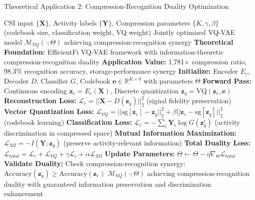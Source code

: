 \documentclass[journal]{IEEEtran}
\begin{document}
\begin{algorithm}[h]
\caption{Theoretical Application 2: Compression-Recognition Duality Optimization}
\label{alg:compression_recognition_duality}
\begin{algorithmic}[1]
\REQUIRE CSI input $\{\mathbf{X}\}$, Activity labels $\{\mathbf{Y}\}$, Compression parameters $\{K, \gamma, \beta\}$ (codebook size, classification weight, VQ weight)
\ENSURE Jointly optimized VQ-VAE model $\mathcal{M}_{VQ}(\cdot; \Theta)$ achieving compression-recognition synergy
\STATE \textbf{Theoretical Foundation:} EfficientFi VQ-VAE framework \cite{chen2024efficientfi} with information-theoretic compression-recognition duality
\STATE \textbf{Application Value:} 1,781× compression ratio, 98.3\% recognition accuracy, storage-performance synergy
\STATE \textbf{Initialize:} Encoder $E_c$, Decoder $D$, Classifier $G$, Codebook $\mathbf{e} \in \mathbb{R}^{K \times d}$ with parameters $\Theta$
\STATE \textbf{Forward Pass:} Continuous encoding $\mathbf{z}_e = E_c(\mathbf{X})$, Discrete quantization $\mathbf{z}_q = \text{VQ}(\mathbf{z}_e, \mathbf{e})$
\STATE \textbf{Reconstruction Loss:} $\mathcal{L}_r = ||\mathbf{X} - D(\mathbf{z}_q)||_2^2$ (signal fidelity preservation)
\STATE \textbf{Vector Quantization Loss:} $\mathcal{L}_{VQ} = ||\text{sg}[\mathbf{z}_e] - \mathbf{z}_q||_2^2 + \beta ||\mathbf{z}_e - \text{sg}[\mathbf{z}_q]||_2^2$ (codebook learning)
\STATE \textbf{Classification Loss:} $\mathcal{L}_c = -\sum_i \mathbf{Y}_i \log G(\mathbf{z}_q^i)$ (activity discrimination in compressed space)
\STATE \textbf{Mutual Information Maximization:} $\mathcal{L}_{MI} = -I(\mathbf{Y}; \mathbf{z}_q)$ (preserve activity-relevant information)
\STATE \textbf{Total Duality Loss:} $\mathcal{L}_{total} = \mathcal{L}_r + \mathcal{L}_{VQ} + \gamma \mathcal{L}_c + \alpha \mathcal{L}_{MI}$
\STATE \textbf{Update Parameters:} $\Theta \leftarrow \Theta - \eta \nabla_{\Theta} \mathcal{L}_{total}$
\STATE \textbf{Validate Duality:} Check compression-recognition synergy: $\text{Accuracy}(\mathbf{z}_q) \geq \text{Accuracy}(\mathbf{z}_e)$
\RETURN $\mathcal{M}_{VQ}(\cdot; \Theta)$ achieving compression-recognition duality with guaranteed information preservation and discrimination enhancement
\end{algorithmic}
\end{algorithm}
\end{document}
